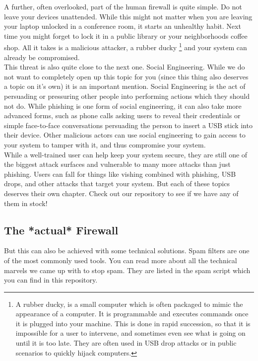 A further, often overlooked, part of the human firewall is quite simple.
Do not leave your devices unattended.
While this might not matter when you are leaving your laptop unlocked in a conference room, it starts an unhealthy habit.
Next time you might forget to lock it in a public library or your neighborhoods coffee shop.
All it takes is a malicious attacker, a rubber ducky \footnote{A rubber ducky, is a small computer which is often packaged to mimic the appearance of a computer. It is programmable and executes commands once it is plugged into your machine. This is done in rapid succession, so that it is impossible for a user to intervene, and sometimes even see what is going on until it is too late. They are often used in USB drop attacks or in public scenarios to quickly hijack computers.} and your system can already be compromised.
\\

This threat is also quite close to the next one.
Social Engineering.
While we do not want to completely open up this topic for you (since this thing also deserves a topic on it's own) it is an important mention.
Social Engineering is the act of persuading or pressuring other people into performing actions which they should not do.
While phishing is one form of social engineering, it can also take more advanced forms, such as phone calls asking users to reveal their credentials or simple face-to-face conversations persuading the person to insert a USB stick into their device.
Other malicious actors can use social engineering to gain access to your system to tamper with it, and thus compromise your system.
\\

While a well-trained user can help keep your system secure, they are still one of the biggest attack surfaces and vulnerable to many more attacks than just phishing.
Users can fall for things like vishing combined with phishing, USB drops, and other attacks that target your system.
But each of these topics deserves their own chapter.
Check out our repository to see if we have any of them in stock!
\\

\subsection{The *actual* Firewall}
\label{sec:technical_countermeasures}

But this can also be achieved with some technical solutions.
Spam filters are one of the most commonly used tools.
You can read more about all the technical marvels we came up with to stop spam.
They are listed in the spam script which you can find in this repository.
\\

